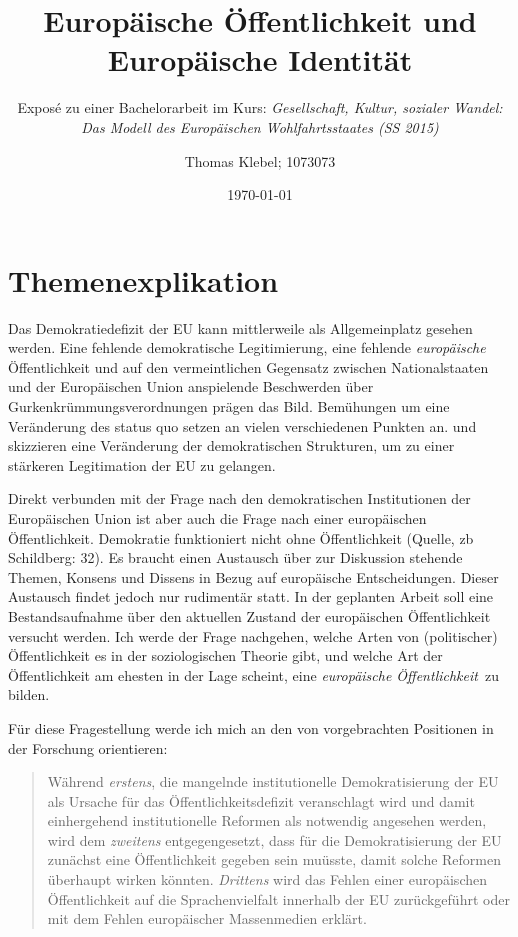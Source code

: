 \documentclass[a4paper, german, oneside]{scrartcl}
\date{\displaydate{date}}
\title{Europäische Öffentlichkeit und Europäische Identität}
\subtitle{Exposé zu einer Bachelorarbeit im Kurs: \emph{Gesellschaft, Kultur, sozialer Wandel: Das Modell des Europäischen Wohlfahrtsstaates (SS 2015)}}
\date{\today}
\author{Thomas Klebel; 1073073}
\newcommand{\citet}[1]{\textcite{#1}}
\begin{document}
\maketitle
\tableofcontents

\section{Themenexplikation}
Das Demokratiedefizit der EU kann mittlerweile als Allgemeinplatz gesehen werden. Eine fehlende demokratische Legitimierung, eine fehlende \emph{europäische} Öffentlichkeit und auf den vermeintlichen Gegensatz zwischen Nationalstaaten und der Europäischen Union anspielende Beschwerden über Gurkenkrümmungsverordnungen prägen das Bild. Bemühungen um eine Veränderung des status quo setzen an vielen verschiedenen Punkten an. \citet{grozelier_democracy_2013_habermas} und \citet{grozelier_europes_2013_hill} skizzieren eine Veränderung der demokratischen Strukturen, um zu einer stärkeren Legitimation der EU zu gelangen.

Direkt verbunden mit der Frage nach den demokratischen Institutionen der Europäischen Union ist aber auch die Frage nach einer europäischen Öffentlichkeit. Demokratie funktioniert nicht ohne Öffentlichkeit (Quelle, zb Schildberg: 32). Es braucht einen Austausch über zur Diskussion stehende Themen, Konsens und Dissens in Bezug auf europäische Entscheidungen. Dieser Austausch findet jedoch nur rudimentär statt. In der geplanten Arbeit soll eine Bestandsaufnahme über den aktuellen Zustand der europäischen Öffentlichkeit versucht werden. Ich werde der Frage nachgehen, welche Arten von (politischer) Öffentlichkeit es in der soziologischen Theorie gibt, und welche Art der Öffentlichkeit am ehesten in der Lage scheint, eine \emph{europäische Öffentlichkeit} zu bilden.

Für diese Fragestellung werde ich mich an den von \citet{schildberg_politische_2010} vorgebrachten Positionen in der Forschung orientieren: \blockquote[{\cite[32]{schildberg_politische_2010}}]{Während \emph{erstens}, die mangelnde institutionelle Demokratisierung der EU als Ursache für das Öffentlichkeitsdefizit veranschlagt wird und damit einhergehend institutionelle Reformen als notwendig angesehen werden, wird dem \emph{zweitens} entgegengesetzt, dass für die Demokratisierung der EU zunächst eine Öffentlichkeit gegeben sein muüsste, damit solche Reformen überhaupt wirken könnten. \emph{Drittens} wird das Fehlen einer europäischen Öffentlichkeit auf die Sprachenvielfalt innerhalb der EU zurückgeführt oder mit dem Fehlen europäischer Massenmedien erklärt.}
\end{document}

